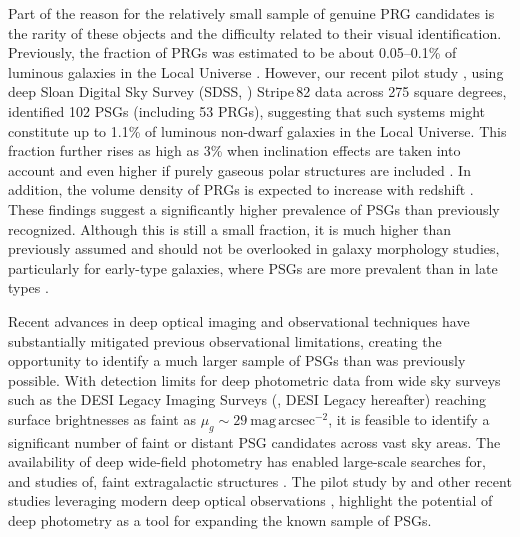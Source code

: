 \documentclass{aa}
\begin{document}
Part of the reason for the relatively small sample of genuine PRG candidates is the rarity of these objects and the difficulty related to their visual identification. Previously, the fraction of PRGs was estimated to be about 0.05--0.1\% of luminous galaxies in the Local Universe \citep{1990AJ....100.1489W, 2011AstL...37..171R, 2022MNRAS.516.3692S}. However, our recent pilot study \citep{2024A&A...681L..15M}, using deep Sloan Digital Sky Survey (SDSS, \citealt{2000AJ....120.1579Y}) Stripe\,82 data across 275 square degrees, identified 102 PSGs (including 53 PRGs), suggesting that such systems might constitute up to 1.1\% of luminous non-dwarf galaxies in the Local Universe. This fraction further rises as high as 3\% when inclination effects are taken into account and even higher if purely gaseous polar structures are included \citep{2023MNRAS.525.4663D}. In addition, the volume density of PRGs is expected to increase with redshift \citep{reshetnikov1997,2022MNRAS.516.3692S}. These findings suggest a significantly higher prevalence of PSGs than previously recognized. Although this is still a small fraction, it is much higher than previously assumed and should not be overlooked in galaxy morphology studies, particularly for early-type galaxies, where PSGs are more prevalent than in late types \citep{1990AJ....100.1489W}. 

Recent advances in deep optical imaging and observational techniques \citep[see e.g.,][]{2017ASSL..434..255K,2019MNRAS.490.1539R} have substantially mitigated previous observational limitations, creating the opportunity to identify a much larger sample of PSGs than was previously possible. With detection limits for deep photometric data from wide sky surveys such as the DESI Legacy Imaging Surveys (\citealt{2019AJ....157..168D}, DESI Legacy hereafter) reaching surface brightnesses as faint as $\mu_{g}\sim29 ~\mathrm{mag}\,\mathrm{arcsec}^{-2}$, it is feasible to identify a significant number of faint or distant PSG candidates across vast sky areas. The availability of deep wide-field photometry has enabled large-scale searches for, and studies of, faint extragalactic structures \citep{2022MNRAS.515.5335L, 2023A&A...671A.141M}. The pilot study by \citet{2024A&A...681L..15M} and other recent studies leveraging modern deep optical observations \citep{2019MNRAS.490.1539R, 2020MNRAS.494.1751M, 2020MNRAS.497.2039M, 2021MNRAS.503.6059P, 2023MNRAS.519.4735S, 2023MNRAS.525.3016M, 2024MNRAS.52710615M, 2024MNRAS.532..883S}, highlight the potential of deep photometry as a tool for expanding the known sample of PSGs.
\end{document}
